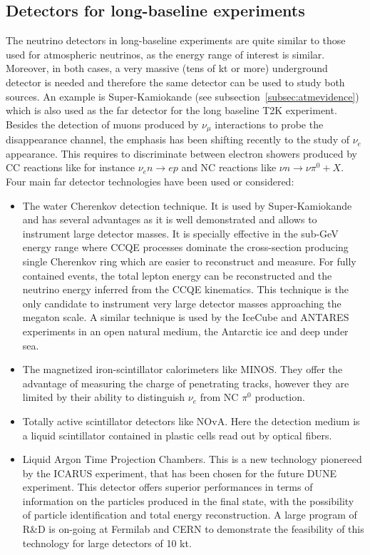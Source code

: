 \subsection{Detectors for long-baseline experiments}

The neutrino detectors in long-baseline experiments are quite similar to those used for atmospheric neutrinos, as the energy range of interest is similar. Moreover, in both cases, a very massive (tens of kt or more) underground detector is needed and therefore the same detector can be used to study both sources. An example is Super-Kamiokande (see subsection~\ref{subsec:atmevidence}) which is also used as the far detector for the long baseline T2K experiment. 
Besides the detection of muons produced by $\nu_\mu$ interactions to probe the disappearance channel, the emphasis has been shifting recently to the study of $\nu_e$ appearance. This requires to discriminate between electron showers produced by CC reactions like for instance $ \nu_e n \rightarrow e p$ and NC reactions like $\nu n \rightarrow \nu \pi^0 + X$.
Four main far detector technologies have been used or considered: 
\begin{itemize}
\item The water Cherenkov detection technique. It is used by Super-Kamiokande and has several advantages as it is well demonstrated and allows to instrument large detector masses. It is specially effective in the sub-GeV energy range where CCQE processes dominate the cross-section producing single Cherenkov ring which are easier to reconstruct and measure. For fully contained events, the total lepton energy can be reconstructed and the neutrino energy inferred from the CCQE kinematics. This technique is the only candidate to instrument very large detector masses approaching the megaton scale.
A similar technique is used by the IceCube and ANTARES experiments in an open natural medium, the Antarctic ice and deep under sea.
\item The magnetized iron-scintillator calorimeters like MINOS. They offer the advantage of measuring the charge of penetrating tracks, however they are limited by their ability to distinguish $\nu_e$ from NC $\pi^0$ production.
\item Totally active scintillator detectors like NOvA. Here the detection medium is a liquid scintillator contained in plastic cells read out by optical fibers.
\item Liquid Argon Time Projection Chambers. This is a new technology pionereed by the ICARUS experiment, that has been chosen for the future DUNE experiment. This detector offers superior performances in terms of information on the particles produced in the final state, with the possibility of particle identification and total energy reconstruction. A large program of R\&D is on-going at Fermilab and CERN to demonstrate the feasibility of this technology for large detectors of 10 kt.
\end{itemize}

